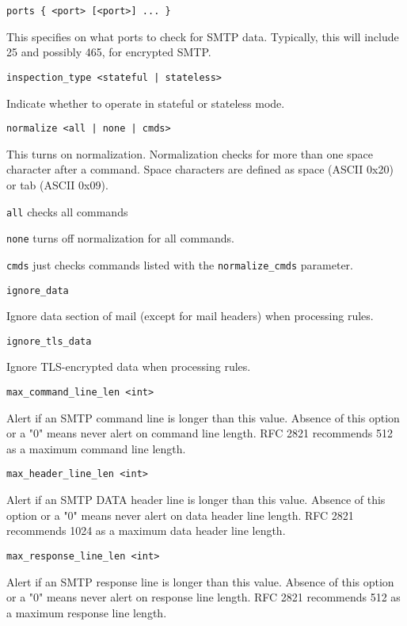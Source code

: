 \documentclass[english]{report}
\newcounter{slistnum}
\newenvironment{slist}
{ \begin{list}{ {\bf \arabic{slistnum}.} }{\usecounter{slistnum} } }
{ \end{list} }
\begin{document}
\begin{slist}

\item \texttt{ports \{ <port> [<port>] ... \}}

This specifies on what ports to check for SMTP data.  Typically, this will
include 25 and possibly 465, for encrypted SMTP.

\item \texttt{inspection\_type <stateful | stateless>}

Indicate whether to operate in stateful or stateless mode.

\item \texttt{normalize <all | none | cmds>}

This turns on normalization.  Normalization checks for more than one space
character after a command.  Space characters are defined as space (ASCII 0x20)
or tab (ASCII 0x09).

\texttt{all} checks all commands

\texttt{none} turns off normalization for all commands.

\texttt{cmds} just checks commands listed with the \texttt{normalize\_cmds} parameter.

\item \texttt{ignore\_data}

Ignore data section of mail (except for mail headers) when processing rules.

\item \texttt{ignore\_tls\_data}

Ignore TLS-encrypted data when processing rules.

\item \texttt{max\_command\_line\_len <int>}

Alert if an SMTP command line is longer than this value.  Absence of this
option or a "0" means never alert on command line length.  RFC 2821 recommends
512 as a maximum command line length.

\item \texttt{max\_header\_line\_len <int>}

Alert if an SMTP DATA header line is longer than this value.  Absence of this
option or a "0" means never alert on data header line length.  RFC 2821
recommends 1024 as a maximum data header line length.

\item \texttt{max\_response\_line\_len <int>}

Alert if an SMTP response line is longer than this value.  Absence of this
option or a "0" means never alert on response line length.  RFC 2821 recommends
512 as a maximum response line length.


\end{slist}
\end{document}
